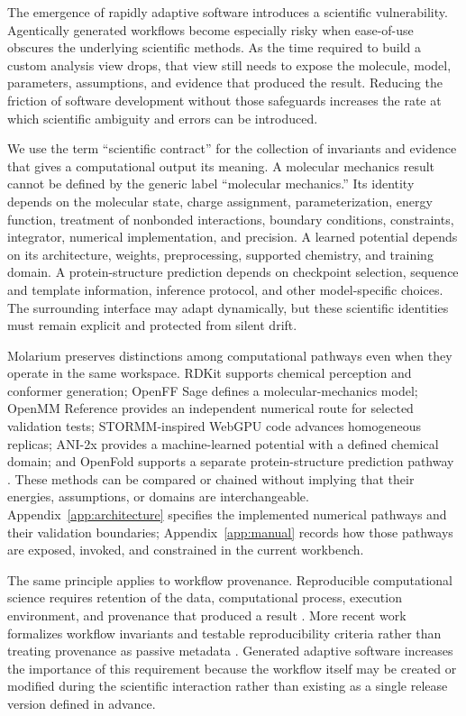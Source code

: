 \documentclass[11pt]{article}
\begin{document}
The emergence of rapidly adaptive software introduces a scientific vulnerability. Agentically generated workflows become especially risky when ease-of-use obscures the underlying scientific methods. As the time required to build a custom analysis view drops, that view still needs to expose the molecule, model, parameters, assumptions, and evidence that produced the result. Reducing the friction of software development without those safeguards increases the rate at which scientific ambiguity and errors can be introduced.

We use the term ``scientific contract'' for the collection of invariants and evidence that gives a computational output its meaning. A molecular mechanics result cannot be defined by the generic label ``molecular mechanics.'' Its identity depends on the molecular state, charge assignment, parameterization, energy function, treatment of nonbonded interactions, boundary conditions, constraints, integrator, numerical implementation, and precision. A learned potential depends on its architecture, weights, preprocessing, supported chemistry, and training domain. A protein-structure prediction depends on checkpoint selection, sequence and template information, inference protocol, and other model-specific choices. The surrounding interface may adapt dynamically, but these scientific identities must remain explicit and protected from silent drift.

Molarium preserves distinctions among computational pathways even when they operate in the same workspace. RDKit supports chemical perception and conformer generation; OpenFF Sage defines a molecular-mechanics model; OpenMM Reference provides an independent numerical route for selected validation tests; STORMM-inspired WebGPU code advances homogeneous replicas; ANI-2x provides a machine-learned potential with a defined chemical domain; and OpenFold supports a separate protein-structure prediction pathway \citep{riniker2015etkdg,boothroyd2023sage,eastman2024openmm8,cerutti2024stormm,devereux2020ani2x,ahdritz2024openfold}. These methods can be compared or chained without implying that their energies, assumptions, or domains are interchangeable. Appendix~\ref{app:architecture} specifies the implemented numerical pathways and their validation boundaries; Appendix~\ref{app:manual} records how those pathways are exposed, invoked, and constrained in the current workbench.

The same principle applies to workflow provenance. Reproducible computational science requires retention of the data, computational process, execution environment, and provenance that produced a result \citep{cohenboulakia2017workflows,wilkinson2016fair}. More recent work formalizes workflow invariants and testable reproducibility criteria rather than treating provenance as passive metadata \citep{pritchard2025reproducibility}. Generated adaptive software increases the importance of this requirement because the workflow itself may be created or modified during the scientific interaction rather than existing as a single release version defined in advance.
\end{document}
